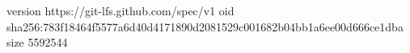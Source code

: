 version https://git-lfs.github.com/spec/v1
oid sha256:783f18464f5577a6d40d4171890d2081529c001682b04bb1a6ee00d666ce1dba
size 5592544
